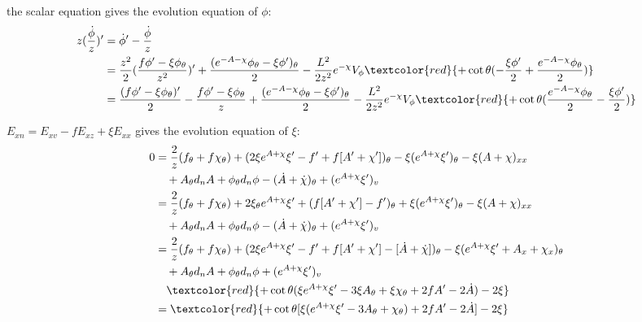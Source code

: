 \documentclass[12pt,a4paper]{ctexart}
\numberwithin{equation}{section}
\begin{document}
the scalar equation gives the evolution equation of $\phi$:
\begin{equation}
    \begin{aligned}
        z(\frac{\dot{\phi}}{z})^{\prime}&=\dot{\phi}^{\prime}-\frac{\dot{\phi}}{z}\\
        &=\frac{z^{2}}{2}(\frac{f\phi'-\xi\phi_{\theta}}{z^{2}})^{\prime}+\frac{(e^{-A-\chi}\phi_{\theta}-\xi\phi')_{\theta}}{2}-\frac{L^{2}}{2z^{2}}e^{-\chi}V_\phi\textcolor{red}{+\cot\theta(-\frac{\xi \phi'}{2}+\frac{e^{-A-\chi}\phi_\theta}{2})}\\
        &=\frac{(f\phi'-\xi\phi_{\theta})'}{2}-\frac{f\phi'-\xi\phi_{\theta}}{z}+\frac{(e^{-A-\chi}\phi_{\theta}-\xi\phi')_{\theta}}{2}-\frac{L^{2}}{2z^{2}}e^{-\chi}V_\phi\textcolor{red}{+\cot\theta(\frac{e^{-A-\chi}\phi_\theta}{2}-\frac{\xi \phi'}{2})}
    \end{aligned}
\end{equation}

$E_{xn}=E_{xv}-fE_{xz}+\xi E_{xx}$ gives the evolution equation of $\xi$:
\begin{equation}
    \begin{aligned}
        0&=\frac{2}{z}(f_{\theta}+f\chi_{\theta})+(2\xi e^{A+\chi}\xi^{\prime}-f^{\prime}+f[A^{\prime}+\chi^{\prime}])_{\theta}-\xi(e^{A+\chi}\xi^{\prime})_{\theta}-\xi(A+\chi)_{xx}\\
        &\quad+A_{\theta}d_{n}A+\phi_{\theta}d_n\phi-(\dot{A}+\dot{\chi})_{\theta}+(e^{A+\chi}\xi^{\prime})_{v}\\
        &=\frac{2}{z}(f_{\theta}+f\chi_{\theta})+2\xi_{\theta}e^{A+\chi}\xi^{\prime}+(f[A^{\prime}+\chi^{\prime}]-f^{\prime})_{\theta}+\xi(e^{A+\chi}\xi^{\prime})_{\theta}-\xi(A+\chi)_{xx}\\
        &\quad+A_{\theta}d_{n}A+\phi_{\theta}d_n\phi-(\dot{A}+\dot{\chi})_{\theta}+(e^{A+\chi}\xi^{\prime})_{v}\\
        &=\frac{2}{z}(f_{\theta}+f\chi_{\theta})+(2\xi e^{A+\chi}\xi^{\prime}-f^{\prime}+f[A^{\prime}+\chi^{\prime}]-[\dot{A}+\dot{\chi}])_{\theta}-\xi(e^{A+\chi}\xi^{\prime}+A_x+\chi_x)_{\theta}\\
        &\quad+A_{\theta}d_{n}A+\phi_{\theta}d_n\phi+(e^{A+\chi}\xi^{\prime})_{v}\\
        &\quad\textcolor{red}{+\cot\theta(\xi e^{A+\chi}\xi'-3\xi A_\theta+\xi\chi_\theta+2f A'-2\dot{A})-2\xi}\\
        &=\textcolor{red}{+\cot\theta[\xi(e^{A+\chi}\xi'-3A_\theta+\chi_\theta)+2f A'-2\dot{A}]-2\xi}
    \end{aligned}
\end{equation}
\end{document}
